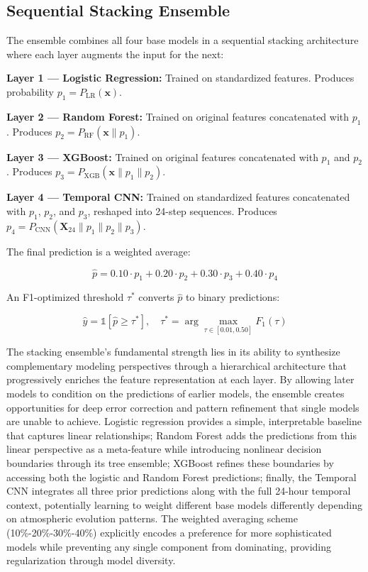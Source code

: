 \documentclass[
  letterpaper,
  DIV=11,
  numbers=noendperiod]{scrartcl}
\begin{document}
\subsection{Sequential Stacking
Ensemble}\label{sequential-stacking-ensemble}

The ensemble combines all four base models in a sequential stacking
architecture where each layer augments the input for the next:

\textbf{Layer 1 --- Logistic Regression:} Trained on standardized
features. Produces probability \(p_1 = P_{\text{LR}}(\mathbf{x})\).

\textbf{Layer 2 --- Random Forest:} Trained on original features
concatenated with \(p_1\). Produces
\(p_2 = P_{\text{RF}}(\mathbf{x} \| p_1)\).

\textbf{Layer 3 --- XGBoost:} Trained on original features concatenated
with \(p_1\) and \(p_2\). Produces
\(p_3 = P_{\text{XGB}}(\mathbf{x} \| p_1 \| p_2)\).

\textbf{Layer 4 --- Temporal CNN:} Trained on standardized features
concatenated with \(p_1\), \(p_2\), and \(p_3\), reshaped into 24-step
sequences. Produces
\(p_4 = P_{\text{CNN}}(\mathbf{X}_{24} \| p_1 \| p_2 \| p_3)\).

The final prediction is a weighted average:

\[\hat{p} = 0.10 \cdot p_1 + 0.20 \cdot p_2 + 0.30 \cdot p_3 + 0.40 \cdot p_4\]

An F1-optimized threshold \(\tau^*\) converts \(\hat{p}\) to binary
predictions:

\[\hat{y} = \mathbb{1}[\hat{p} \geq \tau^*], \quad \tau^* = \arg\max_{\tau \in [0.01, 0.50]} F_1(\tau)\]

The stacking ensemble's fundamental strength lies in its ability to
synthesize complementary modeling perspectives through a hierarchical
architecture that progressively enriches the feature representation at
each layer. By allowing later models to condition on the predictions of
earlier models, the ensemble creates opportunities for deep error
correction and pattern refinement that single models are unable to
achieve. Logistic regression provides a simple, interpretable baseline
that captures linear relationships; Random Forest adds the predictions
from this linear perspective as a meta-feature while introducing
nonlinear decision boundaries through its tree ensemble; XGBoost refines
these boundaries by accessing both the logistic and Random Forest
predictions; finally, the Temporal CNN integrates all three prior
predictions along with the full 24-hour temporal context, potentially
learning to weight different base models differently depending on
atmospheric evolution patterns. The weighted averaging scheme
(10\%-20\%-30\%-40\%) explicitly encodes a preference for more
sophisticated models while preventing any single component from
dominating, providing regularization through model diversity.
\end{document}

